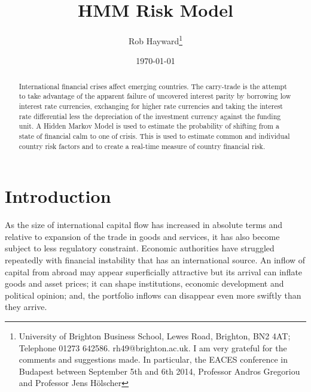 \documentclass[12pt, a4paper, oneside]{article} %
\begin{document}
\title{HMM Risk Model}
\author{Rob Hayward\footnote{University of Brighton Business School, Lewes Road, Brighton, BN2 4AT; Telephone 01273 642586.  rh49@brighton.ac.uk.  I am very grateful for the comments and suggestions made.  In particular, the EACES conference in Budapest between September 5th and 6th 2014, Professor Andros Gregoriou and Professor Jens H\"{o}lscher}} 
\date{\today}
\maketitle
\begin{abstract}
International financial crises affect emerging countries.  The carry-trade is the attempt to take advantage of the apparent failure of uncovered interest parity by borrowing low interest rate currencies, exchanging for higher rate currencies and taking the interest rate differential less the depreciation of the investment currency against the funding unit.  A Hidden Markov Model is used to estimate the probability of shifting from a state of financial calm to one of crisis.  This is used to estimate common and individual country risk factors and to create a real-time measure of country financial risk.
\end{abstract}

\section{Introduction}
As the size of international capital flow has increased in absolute terms and relative to expansion of the trade in goods and services, it has also become subject to less regulatory constraint. Economic authorities have struggled repeatedly with financial instability that has an international source.  An inflow of capital from abroad may appear superficially attractive but its arrival can inflate goods and asset prices; it can shape institutions, economic development and political opinion; and, the portfolio inflows can disappear even more swiftly than they arrive.  %
\end{document}
